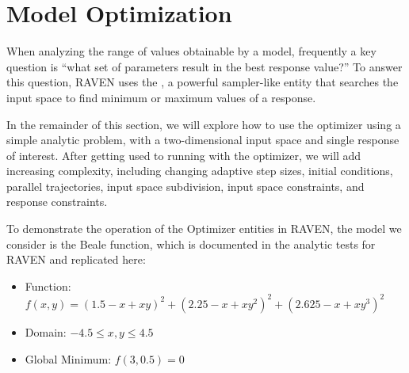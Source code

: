 \section{Model Optimization}
\label{sec:optimizerStrategies}

When analyzing the range of values obtainable by a model, frequently a key question is ``what set of
parameters result in the best response value?''  To answer this question, RAVEN uses the ,
a powerful sampler-like entity that searches the input space to find minimum or maximum values of a response.

In the remainder of this section, we will explore how to use the optimizer using a simple analytic problem,
with a two-dimensional input space and single response of interest.  After getting used to running with the
optimizer, we will add increasing complexity, including changing adaptive step sizes, initial conditions,
parallel trajectories, input space subdivision, input space constraints, and response constraints.

To demonstrate the operation of the Optimizer entities in RAVEN, the model we consider is the Beale function,
which is documented in the analytic tests for RAVEN and replicated here:

\begin{itemize}
  \item Function: $f(x,y) = (1.5-x+xy)^2+(2.25-x+xy^2)^2+(2.625-x+xy^3)^2$
  \item Domain: $-4.5 \leq x,y \leq 4.5$
  \item Global Minimum: $f(3,0.5)=0$
\end{itemize}

